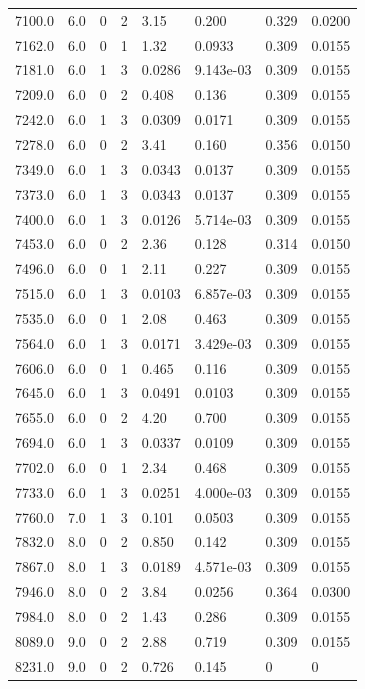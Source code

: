 \documentclass[preview]{standalone}
\begin{document}
{{{{{{{\begin{tabular}{L{1.2cm}C{1.2cm} C{0.3cm}C{0.5cm} C{1.4cm}C{1.4cm} C{1.4cm}C{1.4cm}}
  7100.0  &   6.0  & 0     &  2 &  3.15  & 0.200  & 0.329 &  0.0200   \\ 
  7162.0  &   6.0  & 0     &  1 &  1.32  & 0.0933  & 0.309 &  0.0155   \\ 
  7181.0  &   6.0  & 1     &  3 &  0.0286  & 9.143e-03  & 0.309 &  0.0155   \\ 
  7209.0  &   6.0  & 0     &  2 &  0.408  & 0.136  & 0.309 &  0.0155   \\ 
  7242.0  &   6.0  & 1     &  3 &  0.0309  & 0.0171  & 0.309 &  0.0155   \\ 
  7278.0  &   6.0  & 0     &  2 &  3.41  & 0.160  & 0.356 &  0.0150   \\ 
  7349.0  &   6.0  & 1     &  3 &  0.0343  & 0.0137  & 0.309 &  0.0155   \\ 
  7373.0  &   6.0  & 1     &  3 &  0.0343  & 0.0137  & 0.309 &  0.0155   \\ 
  7400.0  &   6.0  & 1     &  3 &  0.0126  & 5.714e-03  & 0.309 &  0.0155   \\ 
  7453.0  &   6.0  & 0     &  2 &  2.36  & 0.128  & 0.314 &  0.0150   \\ 
  7496.0  &   6.0  & 0     &  1 &  2.11  & 0.227  & 0.309 &  0.0155   \\ 
  7515.0  &   6.0  & 1     &  3 &  0.0103  & 6.857e-03  & 0.309 &  0.0155   \\ 
  7535.0  &   6.0  & 0     &  1 &  2.08  & 0.463  & 0.309 &  0.0155   \\ 
  7564.0  &   6.0  & 1     &  3 &  0.0171  & 3.429e-03  & 0.309 &  0.0155   \\ 
  7606.0  &   6.0  & 0     &  1 &  0.465  & 0.116  & 0.309 &  0.0155   \\ 
  7645.0  &   6.0  & 1     &  3 &  0.0491  & 0.0103  & 0.309 &  0.0155   \\ 
  7655.0  &   6.0  & 0     &  2 &  4.20  & 0.700  & 0.309 &  0.0155   \\ 
  7694.0  &   6.0  & 1     &  3 &  0.0337  & 0.0109  & 0.309 &  0.0155   \\ 
  7702.0  &   6.0  & 0     &  1 &  2.34  & 0.468  & 0.309 &  0.0155   \\ 
  7733.0  &   6.0  & 1     &  3 &  0.0251  & 4.000e-03  & 0.309 &  0.0155   \\ 
  7760.0  &   7.0  & 1     &  3 &  0.101  & 0.0503  & 0.309 &  0.0155   \\ 
  7832.0  &   8.0  & 0     &  2 &  0.850  & 0.142  & 0.309 &  0.0155   \\ 
  7867.0  &   8.0  & 1     &  3 &  0.0189  & 4.571e-03  & 0.309 &  0.0155   \\ 
  7946.0  &   8.0  & 0     &  2 &  3.84  & 0.0256  & 0.364 &  0.0300   \\ 
  7984.0  &   8.0  & 0     &  2 &  1.43  & 0.286  & 0.309 &  0.0155   \\ 
  8089.0  &   9.0  & 0     &  2 &  2.88  & 0.719  & 0.309 &  0.0155   \\ 
  8231.0  &   9.0  & 0     &  2 &  0.726  & 0.145  & 0 &  0   \\ 
\hline 
\end{tabular} 

}}}}}}}
\end{document}
